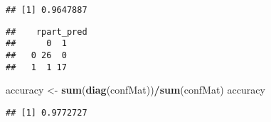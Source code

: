 \documentclass[
]{article}
\newenvironment{Shaded}{\begin{snugshade}}{\end{snugshade}}
\newcommand{\CommentTok}[1]{\textcolor[rgb]{0.56,0.35,0.01}{\textit{#1}}}
\newcommand{\DataTypeTok}[1]{\textcolor[rgb]{0.13,0.29,0.53}{#1}}
\newcommand{\KeywordTok}[1]{\textcolor[rgb]{0.13,0.29,0.53}{\textbf{#1}}}
\newcommand{\NormalTok}[1]{#1}
\newcommand{\OperatorTok}[1]{\textcolor[rgb]{0.81,0.36,0.00}{\textbf{#1}}}
\newcommand{\StringTok}[1]{\textcolor[rgb]{0.31,0.60,0.02}{#1}}
\begin{document}
\begin{verbatim}
## [1] 0.9647887
\end{verbatim}

\begin{Shaded}
\end{Shaded}

\begin{verbatim}
##    rpart_pred
##      0  1
##   0 26  0
##   1  1 17
\end{verbatim}

\begin{Shaded}
\begin{Highlighting}[]
\NormalTok{accuracy <-}\StringTok{ }\KeywordTok{sum}\NormalTok{(}\KeywordTok{diag}\NormalTok{(confMat))}\OperatorTok{/}\KeywordTok{sum}\NormalTok{(confMat)}
\NormalTok{accuracy}
\end{Highlighting}
\end{Shaded}

\begin{verbatim}
## [1] 0.9772727
\end{verbatim}
\end{document}
